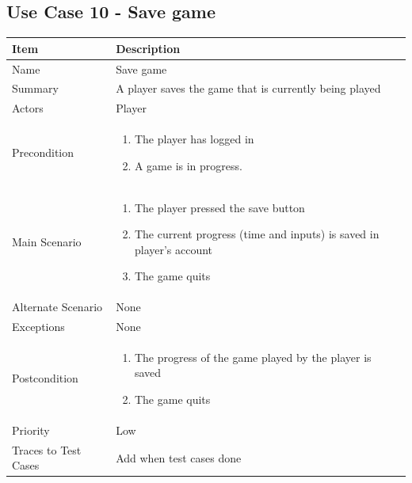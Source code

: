 \documentclass[12pt]{article}
\begin{document}
\newpage


\subsection{Use Case 10 - Save game}

\begin{center}
\setlength{\tabcolsep}{18pt}
\renewcommand{\arraystretch}{1.3}
\begin{tabular}{ |p{3.4cm}|p{10cm}| }
    \hline
    \textbf{Item} & \textbf{Description}\\
    \hline
    Name & Save game \\
    \hline
    Summary & A player saves the game that is currently being played \\
    \hline
    Actors & Player \\
    \hline
    Precondition & 
    \vspace*{-0.1in}
    \begin{enumerate}[leftmargin=0.2in]
        \item The player has logged in
        \item A game is in progress.
        
    \end{enumerate}  \\
    \hline
    Main Scenario &     
    \vspace*{-0.1in}
    \begin{enumerate}[leftmargin=0.2in]
        \item The player pressed the save button
        \item The current progress (time and inputs) is saved in player's account
        \item The game quits
    \end{enumerate}  \\
    \hline
    Alternate Scenario & None \\
    \hline
    Exceptions & None  \\
    \hline
    Postcondition &
    \vspace*{-0.1in}
    \begin{enumerate}[leftmargin=0.2in]
        \item The progress of the game played by the player is saved
        \item The game quits
    \end{enumerate}  \\
    \hline
    Priority & Low \\
    \hline
    \small{Traces to Test Cases} & Add when test cases done  \\
    \hline
\end{tabular}
\end{center}
\end{document}

